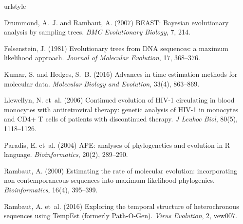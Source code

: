 \documentclass{bioinfo}
\begin{document}
\vspace*{-20pt}


\begin{thebibliography}{14}
\providecommand{\natexlab}[1]{#1}
\providecommand{\url}[1]{\texttt{#1}}
\providecommand{\urlprefix}{URL }
\expandafter\ifx\csname urlstyle\endcsname\relax
  \providecommand{\doi}[1]{doi:\discretionary{}{}{}#1}\else
  \providecommand{\doi}{doi:\discretionary{}{}{}\begingroup
  \urlstyle{rm}\Url}\fi


Drummond, A.~J. and Rambaut, A. (2007) {BEAST}: {Bayesian} evolutionary
  analysis by sampling trees.
\newblock \emph{BMC Evolutionary Biology}, 7, 214.

Felsenstein, J. (1981) Evolutionary trees from {DNA} sequences: a maximum
  likelihood approach.
\newblock \emph{Journal of Molecular Evolution}, 17, 368--376.

Kumar, S. and Hedges, S.~B. (2016) Advances in time estimation methods for
  molecular data.
\newblock \emph{Molecular Biology and Evolution}, 33(4), 863--869.

Llewellyn, N. et~al. (2006) Continued evolution of {HIV-1} circulating in blood
  monocytes with antiretroviral therapy: genetic analysis of {HIV-1} in
  monocytes and {CD4+} {T} cells of patients with discontinued therapy.
\newblock \emph{J Leukoc Biol}, 80(5), 1118--1126.

Paradis, E. et~al. (2004) {APE}: analyses of phylogenetics and evolution in {R}
  language.
\newblock \emph{Bioinformatics}, 20(2), 289--290.

Rambaut, A. (2000) Estimating the rate of molecular evolution: incorporating
  non-contemporaneous sequences into maximum likelihood phylogenies.
\newblock \emph{Bioinformatics}, 16(4), 395--399.

Rambaut, A. et~al. (2016) Exploring the temporal structure of heterochronous
  sequences using {TempEst} (formerly {Path-O-Gen}).
\newblock \emph{Virus Evolution}, 2, vew007.


\end{thebibliography}
\end{document}
